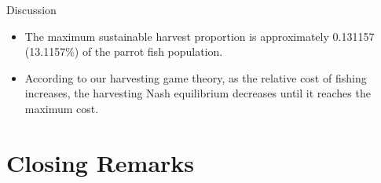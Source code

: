 \documentclass{beamer}
\begin{document}
\begin{frame}{Discussion}
    \begin{itemize}
        \item<1-> The maximum sustainable harvest proportion is approximately 0.131157 (13.1157\%) of the parrot fish population. 
        \item<2-> According to our harvesting game theory, as the relative cost of fishing increases, the harvesting Nash equilibrium decreases until it reaches the maximum cost.
    \end{itemize}
\end{frame}

\section{Closing Remarks}
\end{document}
